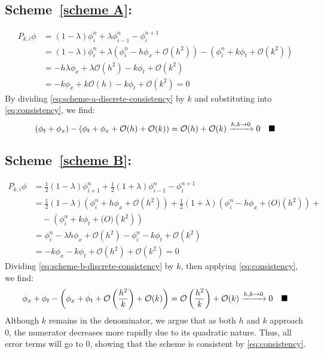 \documentclass{hw_report}
\begin{document}
    \subsection*{Scheme~\ref{scheme A}:}
    \begin{equation}
        \label{eq:scheme-a-discrete-consistency}
        \begin{split}
            P_{k,i}\phi &=(1-\lambda) \phi_i^n +\lambda \phi_{i-1}^n-\phi_i^{n+1} \\
            &= (1-\lambda)\phi_i^n+\lambda \left( \phi_i^n-h\phi_x+\mathcal{O}(h^2) \right) - \left( \phi_i^n+k\phi_t+\mathcal{O}(k^2) \right)\\
            &=-h\lambda \phi_x + \lambda\mathcal{O}(h^2) -k\phi_t+\mathcal{O}(k^2)\\
            &= -k\phi_x+k\mathcal{O}(h)-k\phi_t+\mathcal{O}(k^2) = 0
        \end{split}
    \end{equation}
    By dividing \cref{eq:scheme-a-discrete-consistency} by $k$ and substituting into \cref{eq:consistency}, we find:
    \begin{equation*}
    (\phi_t+\phi_x)
        - \left( \phi_t+\phi_x+\mathcal{O}(h) + \mathcal{O}(k) \right) =\mathcal{O}(h) + \mathcal{O}(k)\xrightarrow{h,k\to 0} 0 \quad \blacksquare
    \end{equation*}

    \subsection*{Scheme~\ref{scheme B}:}
    \begin{equation}
        \label{eq:scheme-b-discrete-consistency}
        \begin{split}
            P_{k,i}\phi &= \frac{1}{2}\left( 1-\lambda \right)\phi_{i+1}^n+\frac{1}{2}\left( 1+\lambda \right)\phi_{i-1}^n-\phi_i^{n+1} \\
            &= \frac{1}{2}(1-\lambda)\left( \phi_i^n+h\phi_x+\mathcal{O}(h^2) \right)+\frac{1}{2}(1+\lambda)\left( \phi_i^n-h\phi_x+\mathcal(O)(h^2) \right) +\\ &\quad - \left( \phi_i^n+k\phi_t+\mathcal(O)(k^2) \right) \\
            &=\phi_i^n-\lambda h\phi_x+\mathcal{O}(h^2)-\phi_i^n-k\phi_t+\mathcal{O}(k^2)\\
            &= -k\phi_x-k\phi_t+\mathcal{O}(h^2)+\mathcal{O}(k^2) = 0
        \end{split}
    \end{equation}
    Dividing \cref{eq:scheme-b-discrete-consistency} by $k$, then applying \cref{eq:consistency}, we find:
    \begin{equation*}
        \phi_x+\phi_t-\left( \phi_x+\phi_t + \mathcal{O}\left(\frac{h^2}{k}\right) + \mathcal{O}(k)\right) = \mathcal{O}\left(\frac{h^2}{k}\right) + \mathcal{O}(k)\xrightarrow{h,k\to 0} 0 \quad \blacksquare
    \end{equation*}
    Although $k$ remains in the denominator, we argue that as both $h$ and $k$ approach 0, the numerator decreases more rapidly due to its quadratic nature.
    Thus, all error terms will go to 0, showing that the scheme is consistent by \cref{eq:consistency}.
\end{document}
